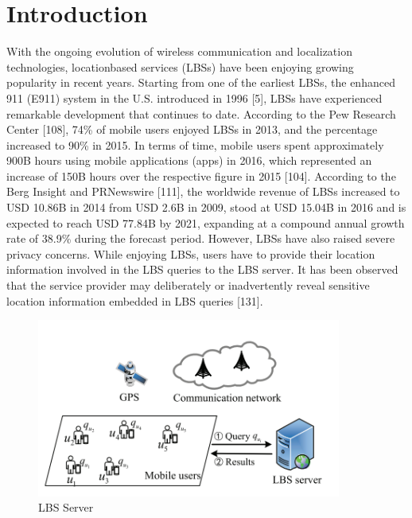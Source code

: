 \documentclass{acmart}
\begin{document}
\tableofcontents
\newpage
\section{Introduction}
With the ongoing evolution of wireless communication and localization technologies, locationbased services (LBSs) have been enjoying growing popularity in recent years. Starting from one of the earliest LBSs, the enhanced 911 (E911) system in the U.S. introduced in 1996 [5], LBSs have experienced remarkable development that continues to date. According to the Pew Research Center [108], 74\% of mobile users enjoyed LBSs in 2013, and the percentage increased to 90\% in 2015. In terms of time, mobile users spent approximately 900B hours using mobile applications (apps) in 2016, which represented an increase of 150B hours over the respective figure in 2015 [104]. According to the Berg Insight and PRNewswire [111], the worldwide revenue of LBSs increased to USD 10.86B in 2014 from USD 2.6B in 2009, stood at USD 15.04B in 2016 and is expected to reach USD 77.84B by 2021, expanding at a compound annual growth rate of 38.9\% during the forecast period. However, LBSs have also raised severe privacy concerns. While enjoying LBSs, users have to provide their location information involved in the LBS queries to the LBS server. It has been observed that the service provider may deliberately or inadvertently reveal sensitive location information embedded in LBS queries [131].
\begin{figure}[H]
    \centering
    \includegraphics[width=100mm]{LBS Server.png}
    \caption{LBS Server}
    \label{1}
\end{figure}
\end{document}
